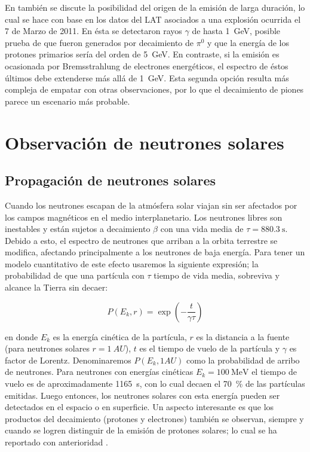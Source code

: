 En \cite{ackermann14} también se discute la posibilidad del origen de la emisión de larga duración, lo cual se hace con base en los datos del LAT asociados a una explosión ocurrida el \num{7} de Marzo de \num{2011}. En ésta se detectaron rayos $\gamma$ de hasta \SI{1}{\giga\electronvolt}, posible prueba de que fueron generados por decaimiento de $\pi^{0}$ y que la energía de los protones primarios sería del orden de \SI{5}{\giga\electronvolt}. En contraste, si la emisión es ocasionada por Bremsstrahlung de electrones energéticos, el espectro de éstos últimos debe extenderse más allá de \SI{1}{\giga\electronvolt}. Esta segunda opción resulta más compleja de empatar con otras observaciones, por lo que el decaimiento de piones parece un escenario más probable.

\section{Observación de neutrones solares}
\subsection{Propagación de neutrones solares}

Cuando los neutrones escapan de la atmósfera solar viajan sin ser afectados por los campos magnéticos en el medio interplanetario. Los neutrones libres son inestables y están sujetos a decaimiento $\beta$ con una vida media de $\tau=\SI{880.3}{\second}$. Debido a esto, el espectro de neutrones que arriban a la orbita terrestre se modifica, afectando principalmente a los neutrones de baja energía. Para tener un modelo cuantitativo de este efecto usaremos la siguiente expresión; la probabilidad de que una partícula con $\tau$ tiempo de vida media, sobreviva y alcance la Tierra sin decaer:

\begin{equation}
P\left(E_{k},r\right)=\exp\left(-\frac{t}{\gamma\tau}\right)
\end{equation}

en donde $E_{k}$ es la energía cinética de la partícula, $r$ es la distancia a la fuente (para neutrones solares $r=\SI{1}{AU}$), $t$ es el tiempo de vuelo de la partícula y $\gamma$ es factor de Lorentz. Denominaremos $P(E_{k},1AU)$ como la probabilidad de arribo de neutrones. Para neutrones con energías cinéticas $E_{k}=\SI{100}{\mega\electronvolt}$ el tiempo de vuelo es de aproximadamente \SI{1165}{\second}, con lo cual decaen el \SI{70}{\percent} de las partículas emitidas. Luego entonces, los neutrones solares con esta energía pueden ser detectados en el espacio o en superficie. Un aspecto interesante es que los productos del decaimiento (protones y electrones) también se observan, siempre y cuando se logren distinguir de la emisión de protones solares; lo cual se ha reportado con anterioridad \cite{evenson83,agueda11}.

